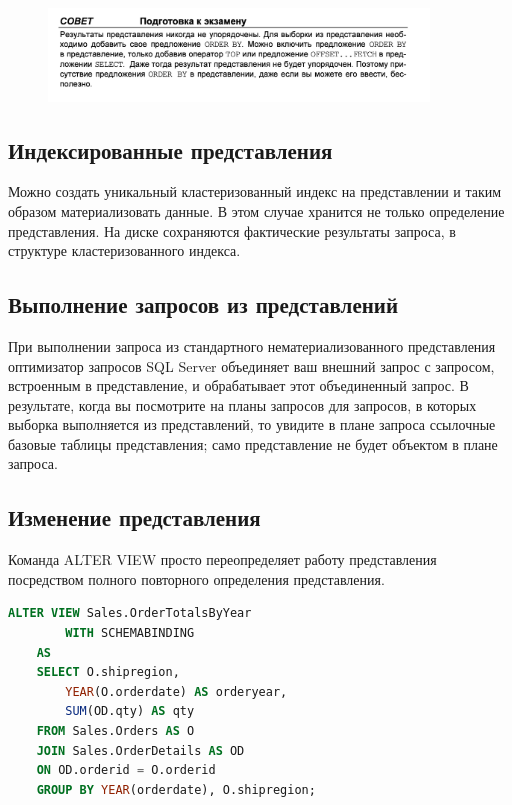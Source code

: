 \begin{figure}[h!]
	\begin{center}
		\includegraphics[width=0.9\textwidth]{img/advice18.png}
	\end{center}
	\captionsetup{justification=centering}
\end{figure}

\subsection{Индексированные представления}

Можно создать уникальный кластеризованный индекс на представлении и таким
образом материализовать данные. В этом случае хранится не только определение
представления. На диске сохраняются фактические результаты запроса, в структуре
кластеризованного индекса. 


\subsection{Выполнение запросов из представлений}

При выполнении запроса из стандартного нематериализованного представления
оптимизатор запросов SQL Server объединяет ваш внешний запрос с запросом,
встроенным в представление, и обрабатывает этот объединенный запрос. В результате, когда вы посмотрите на планы запросов для запросов, в которых выборка выполняется из представлений, то увидите в плане запроса ссылочные базовые таблицы представления; само представление не будет объектом в плане запроса. 

\subsection{Изменение представления}
Команда ALTER VIEW
просто переопределяет работу представления посредством полного повторного определения представления. 

\begin{lstlisting}[label=lst:funcReturn, language=sql]
	ALTER VIEW Sales.OrderTotalsByYear
		WITH SCHEMABINDING
   	AS
   	SELECT O.shipregion,
		YEAR(O.orderdate) AS orderyear,
		SUM(OD.qty) AS qty
   	FROM Sales.Orders AS O
	JOIN Sales.OrderDetails AS OD
	ON OD.orderid = O.orderid
   	GROUP BY YEAR(orderdate), O.shipregion; 
\end{lstlisting}


